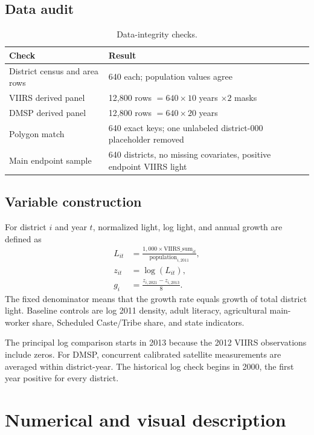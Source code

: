 \documentclass[11pt]{article}
\newcommand{\reportsection}[1]{\Needspace{8\baselineskip}\section{#1}}
\begin{document}
\subsection{Data audit}

\begin{table}[H]
  \centering
  \caption{Data-integrity checks.}
  \begin{tabularx}{\textwidth}{@{}p{}Y@{}}
    \toprule
    \textbf{Check} & \textbf{Result} \\
    \midrule
    District census and area rows & 640 each; population values agree \\
    VIIRS derived panel & 12,800 rows $=640\times10$ years $\times2$ masks \\
    DMSP derived panel & 12,800 rows $=640\times20$ years \\
    Polygon match & 640 exact keys; one unlabeled district-000 placeholder removed \\
    Main endpoint sample & 640 districts, no missing covariates, positive endpoint VIIRS light \\
    \bottomrule
  \end{tabularx}
\end{table}

\subsection{Variable construction}

For district $i$ and year $t$, normalized light, log light, and annual growth
are defined as
\begin{align}
  L_{it} &= \frac{1{,}000\times \mathrm{VIIRS\_sum}_{it}}
                  {\mathrm{population}_{i,2011}}, \\
  z_{it} &= \log(L_{it}), \\
  g_i &= \frac{z_{i,2021}-z_{i,2013}}{8}.
\end{align}
The fixed denominator means that the growth rate equals growth of total
district light. Baseline controls are log 2011 density, adult literacy,
agricultural main-worker share, Scheduled Caste/Tribe share, and state
indicators.

The principal log comparison starts in 2013 because the 2012 VIIRS
observations include zeros. For DMSP, concurrent calibrated satellite
measurements are averaged within district-year. The historical log check
begins in 2000, the first year positive for every district.

\reportsection{Numerical and visual description}
\end{document}
